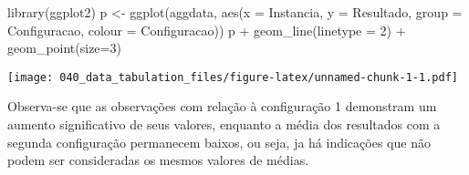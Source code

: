 \documentclass[
]{article}
\newenvironment{Shaded}{\begin{snugshade}}{\end{snugshade}}
\newcommand{\AttributeTok}[1]{\textcolor[rgb]{0.77,0.63,0.00}{#1}}
\newcommand{\DecValTok}[1]{\textcolor[rgb]{0.00,0.00,0.81}{#1}}
\newcommand{\FunctionTok}[1]{\textcolor[rgb]{0.00,0.00,0.00}{#1}}
\newcommand{\NormalTok}[1]{#1}
\newcommand{\OtherTok}[1]{\textcolor[rgb]{0.56,0.35,0.01}{#1}}
\newcommand{\SpecialCharTok}[1]{\textcolor[rgb]{0.00,0.00,0.00}{#1}}
\begin{document}
\begin{Shaded}
\begin{Highlighting}[]
\FunctionTok{library}\NormalTok{(ggplot2)}
\NormalTok{p }\OtherTok{\textless{}{-}} \FunctionTok{ggplot}\NormalTok{(aggdata, }\FunctionTok{aes}\NormalTok{(}\AttributeTok{x =}\NormalTok{ Instancia, }
                         \AttributeTok{y =}\NormalTok{ Resultado, }
                         \AttributeTok{group =}\NormalTok{ Configuracao, }
                         \AttributeTok{colour =}\NormalTok{ Configuracao))}
\NormalTok{p }\SpecialCharTok{+} \FunctionTok{geom\_line}\NormalTok{(}\AttributeTok{linetype =} \DecValTok{2}\NormalTok{) }\SpecialCharTok{+} \FunctionTok{geom\_point}\NormalTok{(}\AttributeTok{size=}\DecValTok{3}\NormalTok{)}
\end{Highlighting}
\end{Shaded}

\texttt{[image: 040\_data\_tabulation\_files/figure-latex/unnamed-chunk-1-1.pdf]}

Observa-se que as observações com relação à configuração 1 demonstram um
aumento significativo de seus valores, enquanto a média dos resultados
com a segunda configuração permanecem baixos, ou seja, ja há indicações
que não podem ser consideradas os mesmos valores de médias.
\end{document}
